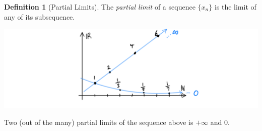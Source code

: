 \documentclass{article}
\theoremstyle{remark}
\theoremstyle{definition}
\newtheorem{definition}{Definition}[section]
\begin{document}
\begin{definition}[Partial Limits]
The \textit{partial limit} of a sequence $\{x_n\}$ is the limit of any of its subsequence.  
\begin{center}
    \includegraphics[scale=0.26]{img/Partial_Limit.PNG}
\end{center}
Two (out of the many) partial limits of the sequence above is $+\infty$ and $0$. 
\end{definition}
\end{document}
